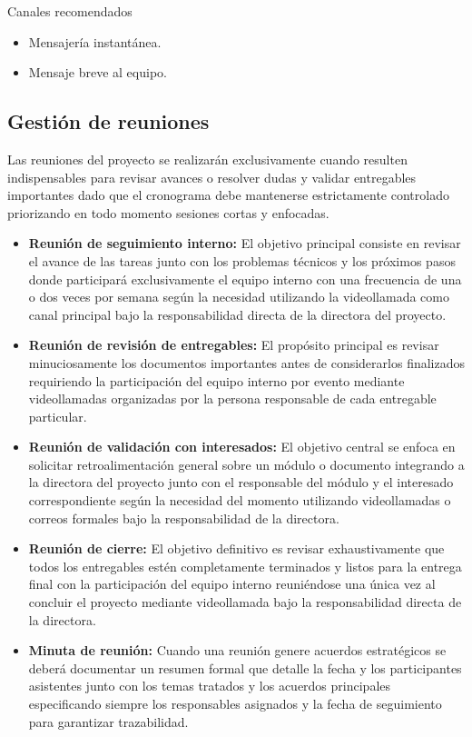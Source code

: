 \documentclass[11pt,spanish]{article}
\begin{document}
\noindent Canales recomendados

\begin{itemize}
    \item Mensajería instantánea.
    \item Mensaje breve al equipo.
\end{itemize}

\subsection{Gestión de reuniones}

Las reuniones del proyecto se realizarán exclusivamente cuando resulten indispensables para revisar avances o resolver dudas y validar entregables importantes dado que el cronograma debe mantenerse estrictamente controlado priorizando en todo momento sesiones cortas y enfocadas.

\begin{itemize}
    \item \textbf{Reunión de seguimiento interno:} El objetivo principal consiste en revisar el avance de las tareas junto con los problemas técnicos y los próximos pasos donde participará exclusivamente el equipo interno con una frecuencia de una o dos veces por semana según la necesidad utilizando la videollamada como canal principal bajo la responsabilidad directa de la directora del proyecto.
    \item \textbf{Reunión de revisión de entregables:} El propósito principal es revisar minuciosamente los documentos importantes antes de considerarlos finalizados requiriendo la participación del equipo interno por evento mediante videollamadas organizadas por la persona responsable de cada entregable particular.
    \item \textbf{Reunión de validación con interesados:} El objetivo central se enfoca en solicitar retroalimentación general sobre un módulo o documento integrando a la directora del proyecto junto con el responsable del módulo y el interesado correspondiente según la necesidad del momento utilizando videollamadas o correos formales bajo la responsabilidad de la directora.
    \item \textbf{Reunión de cierre:} El objetivo definitivo es revisar exhaustivamente que todos los entregables estén completamente terminados y listos para la entrega final con la participación del equipo interno reuniéndose una única vez al concluir el proyecto mediante videollamada bajo la responsabilidad directa de la directora.
    \item \textbf{Minuta de reunión:} Cuando una reunión genere acuerdos estratégicos se deberá documentar un resumen formal que detalle la fecha y los participantes asistentes junto con los temas tratados y los acuerdos principales especificando siempre los responsables asignados y la fecha de seguimiento para garantizar trazabilidad.
\end{itemize}
\end{document}
